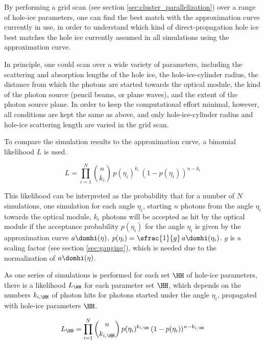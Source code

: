By performing a grid scan (see section \ref{sec:cluster_parallelization}) over a range of hole-ice parameters, one can find the best match with the approximation curve currently in use, in order to understand which kind of direct-propagation hole ice best matches the hole ice currently assumed in all simulations using the approximation curve.


In principle, one could scan over a wide variety of parameters, including the scattering and absorption lengths of the hole ice, the hole-ice-cylinder radius, the distance from which the photons are started towards the optical module, the kind of the photon source (pencil beams, or plane waves), and the extent of the photon source plane. In order to keep the computational effort minimal, however, all conditions are kept the same as above, and only hole-ice-cylinder radius and hole-ice scattering length are varied in the grid scan.

To compare the simulation results to the approximation curve, a binomial likelihood $L$ is used.

\begin{equation}
  L = \prod_{i=1}^N \binom{n}{k_i}\,p(\eta_i)^{k_i}\,(1-p(\eta_i))^{n-k_i}
\end{equation}

This likelihood can be interpreted as the probability that for a number of $N$ simulations, one simulation for each angle $\eta_i$, starting $n$ photons from the angle $\eta_i$ towards the optical module, $k_i$ photons will be accepted as hit by the optical module if the acceptance probability $p(\eta_i)$ for the angle $\eta_i$ is given by the approximation curve $a\domhi(\eta)$, $p(\eta_i) = \sfrac{1}{g}\,a\domhi(\eta_i)$. $g$ is a scaling factor (see section \ref{sec:gauging}), which is needed due to the normalization of $a\domhi(\eta)$.

As one series of simulations is performed for each set $\HH$ of hole-ice parameters, there is a likelihood $L_\HH$ for each parameter set $\HH$, which depends on the numbers $k_{i,\HH}$ of photon hits for photons started under the angle $\eta_i$, propagated with hole-ice parameters $\HH$.

$$
  L_\HH = \prod_{i=1}^N \binom{n}{k_{i,\HH}}\,p(\eta_i)^{k_{i,\HH}}\,(1-p(\eta_i))^{n-k_{i,\HH}}
$$


